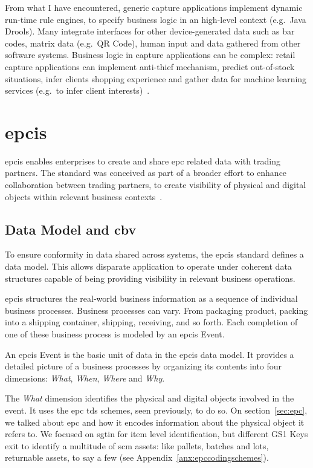 From what I have encountered, generic capture applications implement dynamic run-time rule engines, to specify business logic in an high-level context (e.g.\ Java Drools).
Many integrate interfaces for other device-generated data such as bar codes, matrix data (e.g.\ QR Code), human input and data gathered from other software systems.
Business logic in capture applications can be complex: retail capture applications can implement anti-thief mechanism, predict out-of-stock situations, infer clients shopping experience and gather data for machine learning services (e.g.\ to infer client interests)~\cite{RFIDRetailKey}.

\section{\acf{epcis}}

\ac{epcis} enables enterprises to create and share \ac{epc} related data with trading partners.
The standard was conceived as part of a broader effort to enhance collaboration between trading partners, to create visibility of physical and digital objects within relevant business contexts~\cite{EPCISGuidelines}.

\subsection{Data Model and \acf{cbv}}

To ensure conformity in data shared across systems, the \ac{epcis} standard defines a data model. This allows disparate application to operate under coherent data structures capable of being providing visibility in relevant business operations.

\ac{epcis} structures the real-world business information as a sequence of individual business processes.
Business processes can vary. From packaging product, packing into a shipping container, shipping, receiving, and so forth.
Each completion of one of these business process is modeled by an \ac{epcis} Event.

An \ac{epcis} Event is the basic unit of data in the \ac{epcis} data model.
It provides a detailed picture of a business processes by organizing its contents into four dimensions: \emph{What}, \emph{When}, \emph{Where} and \emph{Why}.

The \emph{What} dimension identifies the physical and digital objects involved in the event. It uses the \ac{epc} \ac{tds} schemes, seen previously, to do so.  On section~\ref{sec:epc}, we talked about \ac{epc} and how it encodes information about the physical object it refers to. We focused on \ac{sgtin} for item level identification, but different GS1 Keys exit to identify a multitude of \ac{scm} assets: like pallets, batches and lots, returnable assets, to say a few (see Appendix~\ref{anx:epccodingschemes}).

